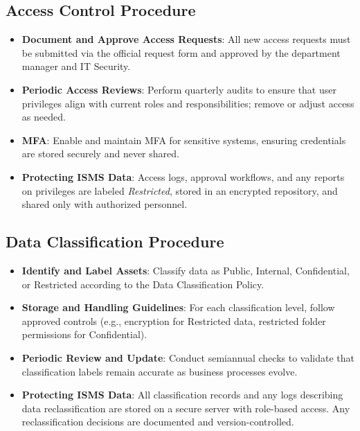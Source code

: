 \subsection{Access Control Procedure}
\begin{itemize}
    \item \textbf{Document and Approve Access Requests}: 
    All new access requests must be submitted via the official request 
    form and approved by the department manager and \ac{IT} Security. 
    \item \textbf{Periodic Access Reviews}: 
    Perform quarterly audits to ensure that user privileges align with 
    current roles and responsibilities; remove or adjust access as needed.
    \item \textbf{\ac{MFA}}:
    Enable and maintain \ac{MFA} for sensitive systems, ensuring credentials 
    are stored securely and never shared.
    \item \textbf{Protecting \ac{ISMS} Data}:
    Access logs, approval workflows, and any reports on privileges 
    are labeled \textit{Restricted}, stored in an encrypted repository, 
    and shared only with authorized personnel.
\end{itemize}

\subsection{Data Classification Procedure}
\begin{itemize}
    \item \textbf{Identify and Label Assets}: 
    Classify data as Public, Internal, Confidential, or Restricted 
    according to the Data Classification Policy.
    \item \textbf{Storage and Handling Guidelines}:
    For each classification level, follow approved controls 
    (e.g., encryption for Restricted data, restricted folder 
    permissions for Confidential).
    \item \textbf{Periodic Review and Update}:
    Conduct semiannual checks to validate that classification 
    labels remain accurate as business processes evolve.
    \item \textbf{Protecting \ac{ISMS} Data}:
    All classification records and any logs describing data 
    reclassification are stored on a secure server with 
    role-based access. Any reclassification decisions are 
    documented and version-controlled.
\end{itemize}

